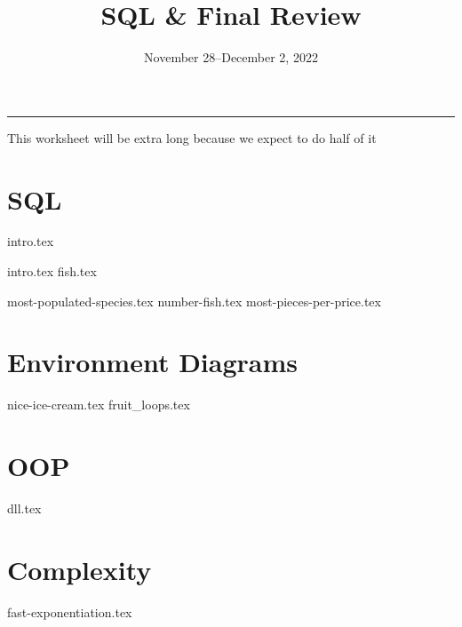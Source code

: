 \documentclass{exam}
\title{SQL \& Final Review}
\date{November 28--December 2, 2022}
\begin{document}
\maketitle\rule{\textwidth}{0.15em}

\begin{guide}
    This worksheet will be extra long because we expect to do half of it 
\end{guide}


\section{SQL}
{intro.tex}

{intro.tex}
{fish.tex}
\begin{questions}
  {most-populated-species.tex}
  {number-fish.tex}
  {most-pieces-per-price.tex}
\end{questions}


\section{Environment Diagrams}
\begin{questions}
{nice-ice-cream.tex}
{fruit_loops.tex}
\end{questions}

\section{OOP}
\begin{questions}
{dll.tex}
\end{questions}

\section{Complexity}
\begin{questions}
{fast-exponentiation.tex}
\end{questions}
\end{document}
